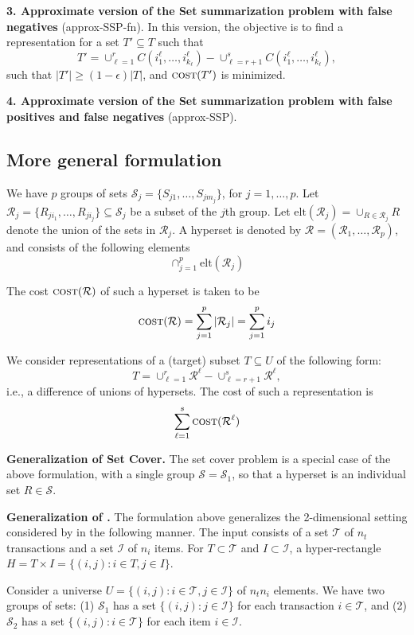 \documentclass[twoside, leqno, twocolumn]{article}
\newcommand{\cost}{\textsc{cost}}
\newcommand{\elt}{\text{elt}}
\begin{document}
\noindent
\textbf{3. Approximate version of the Set summarization problem
with false negatives} (approx-SSP-fn). 
In this version, the objective is to find a representation for a set $T'\subseteq T$ such that
\[
T' = \cup_{\ell=1}^r C(i^{\ell}_1,\ldots,i^{\ell}_{k_{\ell}}) - 
 \cup_{\ell=r+1}^s C(i^{\ell}_1,\ldots,i^{\ell}_{k_{\ell}}),
\]
such that $|T'|\geq (1-\epsilon)|T|$, and $\cost(T')$ is minimized.

\noindent
\textbf{4. Approximate version of the Set summarization problem
with false positives and false negatives} (approx-SSP). 

\subsection{More general formulation}

We have $p$ groups of sets $\mathcal{S}_j=\{S_{j1},\ldots,S_{jm_j}\}$, for $j=1,\ldots,p$.
Let $\mathcal{R}_j=\{R_{ji_1},\ldots,R_{ji_j}\}\subseteq\mathcal{S}_j$ 
be a subset of the $j$th group. Let $\elt(\mathcal{R}_j) = \cup_{R\in \mathcal{R}_j} R$
denote the union of the sets in $\mathcal{R}_j$.
A hyperset is denoted by $\mathcal{R}=(\mathcal{R}_1,\ldots,\mathcal{R}_p)$,
and consists of the following elements
\[
\cap_{j=1}^p \elt(\mathcal{R}_j)
\]

The cost $\cost(\mathcal{R})$ of such a hyperset is taken to be
\[
\cost(\mathcal{R}) = \sum_{j=1}^p |\mathcal{R}_j| = \sum_{j=1}^p i_j
\]

We consider representations of a (target) subset $T\subseteq U$ of the following form:
\[
T = \cup_{\ell=1}^r \mathcal{R}^{\ell} - \cup_{\ell=r+1}^s \mathcal{R}^{\ell},
\]
i.e., a difference of unions of hypersets. The cost of such a representation is
\[
\sum_{\ell=1}^s\cost(\mathcal{R}^{\ell})
\]

\noindent
\textbf{Generalization of Set Cover.}
The set cover problem is a special case of the above formulation, with a single group
$\mathcal{S}=\mathcal{S}_1$, so that a hyperset is an individual set $R\in\mathcal{S}$.

\noindent
\textbf{Generalization of \cite{xiang:dmkd2011}.}
The formulation above generalizes the 2-dimensional setting considered by
\cite{xiang:dmkd2011} in the following manner. The input consists of a set
$\mathcal{T}$ of $n_t$ transactions and a set $\mathcal{I}$ of $n_i$ items.
For $T\subset\mathcal{T}$ and $I\subset\mathcal{I}$,
a hyper-rectangle $H=T\times I=\{(i, j): i\in T, j\in I\}$.

Consider a universe $U=\{(i, j): i\in \mathcal{T}, j\in\mathcal{I}\}$ of $n_tn_i$ elements.
We have two groups of sets:
(1) $\mathcal{S}_1$ has a set $\{(i, j): j\in \mathcal{I}\}$ for each transaction 
$i\in\mathcal{T}$, and
(2) $\mathcal{S}_2$ has a set $\{(i, j): i\in \mathcal{T}\}$ for each item $i\in\mathcal{I}$.
\end{document}
